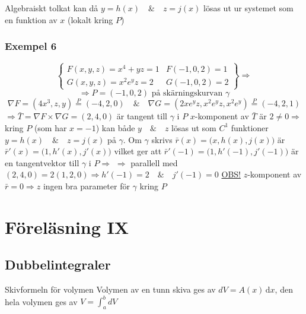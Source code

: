 \documentclass[a4paper]{article}
\begin{document}
Algebraiskt tolkat kan då \(y = h(x) \quad\&\quad z = j(x)\) lösas ut ur systemet som en funktion av \(x\) (lokalt kring \(P\))

\subsubsection{Exempel 6} 
\begin{equation}\label{eq:8.8}
	\begin{Bmatrix}
		F(x,y,z) = x^4 + yz = 1 & F(-1,0,2) = 1 \\
		G(x,y,z) = x^2e^yz = 2 & G(-1,0,2) = 2
	\end{Bmatrix} \Rightarrow
\end{equation}
\[\Rightarrow P = (-1,0,2) \text{ på skärningskurvan } \gamma\]
\[\nabla F = (4x^3,z,y) \overset{P}{=} (-4,2,0) \quad\&\quad \nabla G = (2xe^yz,x^2e^yz,x^2e^y) \overset{P}{=} (-4,2,1)\]
\(\Rightarrow \bar{T} = \nabla F \times \nabla G = (2,4,0)\) är tangent till \(\gamma\) i \(P\) \newline
\(x\)-komponent av \(\bar{T}\) är \(2 \neq 0 \Rightarrow\) kring \(P\) (som har \(x = -1\)) kan både \(y \quad\&\quad z\) lösas ut som \(C^1\) funktioner \(y = h(x) \quad\&\quad z = j(x)\) på \(\gamma\). \newline
Om \(\gamma\) skrivs \(\bar{r}(x) = \Big(x,h(x),j(x)\Big)\) är \(\bar{r}'(x) = \Big(1,h'(x),j'(x)\Big)\) vilket ger att \(\bar{r}'(-1) = \Big(1,h'(-1),j'(-1)\Big)\) är en tangentvektor till \(\gamma\) i \(P \Rightarrow\) \newline
\(\Rightarrow\) parallell med \((2,4,0) = 2(1,2,0) \Rightarrow h'(-1) = 2 \quad\&\quad j'(-1) = 0\) \newline
\underline{OBS!} \(z\)-komponent av \(\bar{r} = 0 \Rightarrow z\) ingen bra parameter för \(\gamma\) kring \(P\)







\section{Föreläsning IX}
\subsection{Dubbelintegraler}
Skivformeln för volymen \newline
Volymen av en tunn skiva ges av $dV = A(x)\,\mathrm{d}x$, den hela volymen ges av $V = \int_a^b dV$
\end{document}
